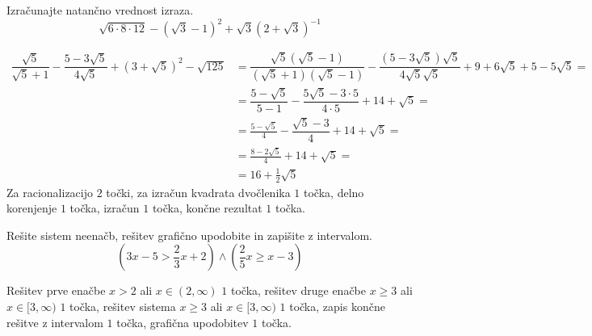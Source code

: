 \documentclass[addpoints]{exam}
\begin{document}
\begin{questions}
    
   
   
   
   




    \question[4]
    Izračunajte natančno vrednost izraza.
    $$ \sqrt{6\cdot 8\cdot 12}-\left(\sqrt{3}-1\right)^2+\sqrt{3}\left(2+\sqrt{3}\right)^{-1} $$

    \begin{solution}[9cm]
        \begin{align*} 
            \dfrac{\sqrt{5}}{\sqrt{5}+1}-\dfrac{5-3\sqrt{5}}{4\sqrt{5}}+\left(3+\sqrt{5}\right)^2-\sqrt{125}&=\dfrac{\sqrt{5}(\sqrt{5}-1)}{(\sqrt{5}+1)(\sqrt{5}-1)}-\dfrac{(5-3\sqrt{5})\sqrt{5}}{4\sqrt{5}\sqrt{5}}+9+6\sqrt{5}+5-5\sqrt{5}= \\
                                                                                                            &=\dfrac{5-\sqrt{5}}{5-1}-\dfrac{5\sqrt{5}-3\cdot 5}{4\cdot 5}+14+\sqrt{5}= \\
                                                                                                            &=\frac{5-\sqrt{5}}{4}-\dfrac{\sqrt{5}-3}{4}+14+\sqrt{5}= \\
                                                                                                            &=\frac{8-2\sqrt{5}}{4}+14+\sqrt{5}= \\
                                                                                                            &=16+\frac{1}{2}\sqrt{5}
        \end{align*}
        Za racionalizacijo $2$ točki, za izračun kvadrata dvočlenika $1$ točka, delno korenjenje $1$ točka, izračun $1$ točka, končne rezultat $1$ točka.
    \end{solution}
    
    

    
        

    
    \question[5]
    Rešite sistem neenačb, rešitev grafično upodobite in zapišite z intervalom.
    $$ \left(3x-5>\frac{2}{3}x+2\right)\land\left(\frac{2}{5}x\geq x-3\right) $$
    
    
    \begin{solution}[8cm]
        Rešitev prve enačbe $x>2$ ali $x\in(2,\infty)$ $1$ točka, rešitev druge enačbe $x\geq 3$ ali $x\in[3,\infty)$ $1$ točka, rešitev sistema $x\geq 3$ ali $x\in[3,\infty)$ $1$ točka, zapis končne rešitve z intervalom $1$ točka, grafična upodobitev $1$ točka.
    \end{solution}



\end{questions}
\end{document}
